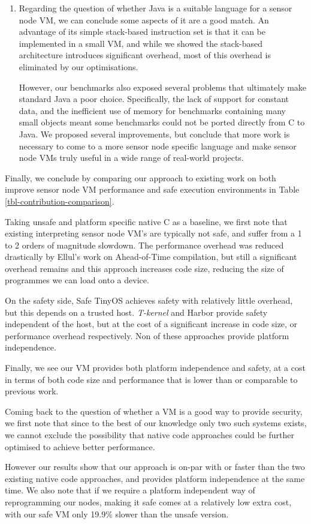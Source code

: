 \begin{enumerate}
	\item
	Regarding the question of whether Java is a suitable language for a sensor node VM, we can conclude some aspects of it are a good match. An advantage of its simple stack-based instruction set is that it can be implemented in a small VM, and while we showed the stack-based architecture introduces significant overhead, most of this overhead is eliminated by our optimisations.
	
	However, our benchmarks also exposed several problems that ultimately make standard Java a poor choice. Specifically, the lack of support for constant data, and the inefficient use of memory for benchmarks containing many small objects meant some benchmarks could not be ported directly from C to Java. We proposed several improvements, but conclude that more work is necessary to come to a more sensor node specific language and make sensor node VMs truly useful in a wide range of real-world projects.
\end{enumerate}



Finally, we conclude by comparing our approach to existing work on both improve sensor node VM performance and safe execution environments in Table \ref{tbl-contribution-comparison}.

Taking unsafe and platform specific native C as a baseline, we first note that existing interpreting sensor node VM's are typically not safe, and suffer from a 1 to 2 orders of magnitude slowdown. The performance overhead was reduced drastically by Ellul's work on Ahead-of-Time compilation, but still a significant overhead remains and this approach increases code size, reducing the size of programmes we can load onto a device.

On the safety side, Safe TinyOS achieves safety with relatively little overhead, but this depends on a trusted host. \emph{T-kernel} and Harbor provide safety independent of the host, but at the cost of a significant increase in code size, or performance overhead respectively. Non of these approaches provide platform independence.

Finally, we see our VM provides both platform independence and safety, at a cost in terms of both code size and performance that is lower than or comparable to previous work.

Coming back to the question of whether a VM is a good way to provide security, we first note that since to the best of our knowledge only two such systems exists, we cannot exclude the possibility that native code approaches could be further optimised to achieve better performance.

However our results show that our approach is on-par with or faster than the two existing native code approaches, and provides platform independence at the same time. We also note that if we require a platform independent way of reprogramming our nodes, making it safe comes at a relatively low extra cost, with our safe VM only 19.9\% slower than the unsafe version.
